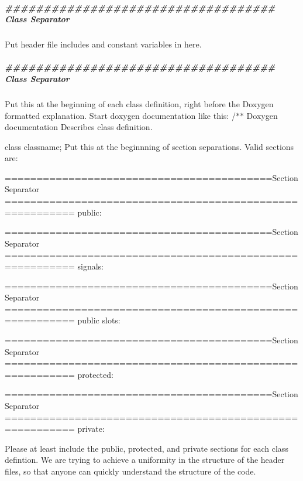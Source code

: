 \subparagraph*{\#\#\#\#\#\#\#\#\#\#\#\#\#\#\#\#\#\#\#\#\#\#\#\#\#\#\#\#\#\#\#\#\#\#\# Class Separator}

Put header file includes and constant variables in here.

\subparagraph*{\#\#\#\#\#\#\#\#\#\#\#\#\#\#\#\#\#\#\#\#\#\#\#\#\#\#\#\#\#\#\#\#\#\#\# Class Separator}

Put this at the beginning of each class definition, right before the Doxygen formatted explanation. Start doxygen documentation like this\-: /$\ast$$\ast$ Doxygen documentation Describes class definition.

class classname; Put this at the beginnning of section separations. Valid sections are\-:

==========================================Section Separator ========================================================= public\-:

==========================================Section Separator ========================================================= signals\-:

==========================================Section Separator ========================================================= public slots\-:

==========================================Section Separator ========================================================= protected\-:

==========================================Section Separator ========================================================= private\-:

Please at least include the public, protected, and private sections for each class defintion. We are trying to achieve a uniformity in the structure of the header files, so that anyone can quickly understand the structure of the code.


